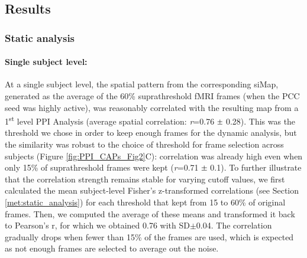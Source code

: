\subsection{Results}

\subsubsection{Static analysis} \label{sec:static_analysis} 

\paragraph{Single subject level: }  
At a single subject level, the spatial pattern from the corresponding siMap, generated as the average of the 60\% suprathreshold fMRI frames (when the PCC seed was highly active), was  reasonably correlated with the resulting map from a 1\textsuperscript{st} level PPI Analysis (average spatial correlation: \textit{r}=0.76 $\Mypm$ 0.28). This was the threshold we chose in order to keep enough frames for the dynamic analysis, but the similarity was robust to the choice of threshold for frame selection across subjects (Figure \ref{fig:PPI_CAPs_Fig2}C): correlation was already high even when only 15\% of  suprathreshold frames were kept (\textit{r}=0.71 $\Mypm$ 0.1). To further illustrate that the correlation strength remains stable for varying cutoff values, we first calculated the mean subject-level Fisher's z-transformed correlations (see Section \ref{met:static_analysis}) for each threshold that kept from 15 to 60\% of original frames. Then, we computed the average of these means and transformed it back to Pearson's r, for which we obtained 0.76 with SD$\pm$0.04. The correlation gradually drops when fewer than 15\% of the frames are used, which is expected as not enough frames are selected to average out the noise. 

